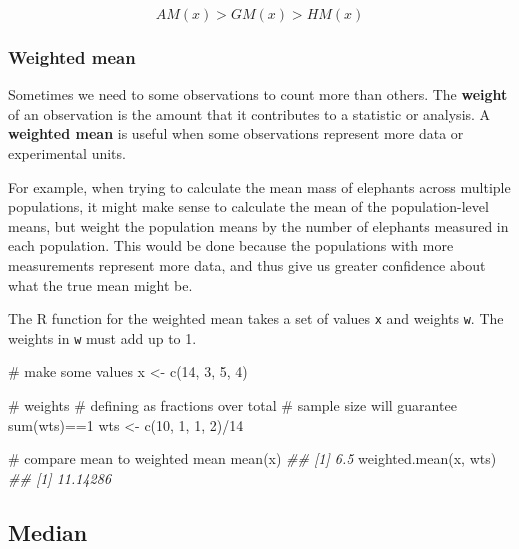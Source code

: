 \documentclass[
  13,
  letterpaper,
]{report}
\newenvironment{Shaded}{\begin{snugshade}}{\end{snugshade}}
\newcommand{\CommentTok}[1]{\textcolor[rgb]{0.37,0.37,0.37}{#1}}
\newcommand{\DecValTok}[1]{\textcolor[rgb]{0.68,0.00,0.00}{#1}}
\newcommand{\DocumentationTok}[1]{\textcolor[rgb]{0.37,0.37,0.37}{\textit{#1}}}
\newcommand{\FunctionTok}[1]{\textcolor[rgb]{0.28,0.35,0.67}{#1}}
\newcommand{\NormalTok}[1]{\textcolor[rgb]{0.00,0.23,0.31}{#1}}
\newcommand{\OtherTok}[1]{\textcolor[rgb]{0.00,0.23,0.31}{#1}}
\newcommand{\SpecialCharTok}[1]{\textcolor[rgb]{0.37,0.37,0.37}{#1}}
\begin{document}
\[AM\left(x\right)>GM\left(x\right)>HM\left(x\right)\]

\subsubsection{Weighted mean}\label{sec-06-cen-mean-wm}

Sometimes we need to some observations to count more than others. The
\textbf{weight} of an observation is the amount that it contributes to a
statistic or analysis. A \textbf{weighted mean} is useful when some
observations represent more data or experimental units.

For example, when trying to calculate the mean mass of elephants across
multiple populations, it might make sense to calculate the mean of the
population-level means, but weight the population means by the number of
elephants measured in each population. This would be done because the
populations with more measurements represent more data, and thus give us
greater confidence about what the true mean might be.

The R function for the weighted mean takes a set of values \texttt{x}
and weights \texttt{w}. The weights in \texttt{w} must add up to 1.

\begin{Shaded}
\begin{Highlighting}[]

\CommentTok{\# make some values}
\NormalTok{x }\OtherTok{\textless{}{-}} \FunctionTok{c}\NormalTok{(}\DecValTok{14}\NormalTok{, }\DecValTok{3}\NormalTok{, }\DecValTok{5}\NormalTok{, }\DecValTok{4}\NormalTok{)}

\CommentTok{\# weights}
\CommentTok{\# defining as fractions over total}
\CommentTok{\# sample size will guarantee sum(wts)==1}
\NormalTok{wts }\OtherTok{\textless{}{-}} \FunctionTok{c}\NormalTok{(}\DecValTok{10}\NormalTok{, }\DecValTok{1}\NormalTok{, }\DecValTok{1}\NormalTok{, }\DecValTok{2}\NormalTok{)}\SpecialCharTok{/}\DecValTok{14}

\CommentTok{\# compare mean to weighted mean}
\FunctionTok{mean}\NormalTok{(x)}
\DocumentationTok{\#\# [1] 6.5}
\FunctionTok{weighted.mean}\NormalTok{(x, wts)}
\DocumentationTok{\#\# [1] 11.14286}
\end{Highlighting}
\end{Shaded}

\subsection{Median}\label{sec-06-cen-med}
\end{document}
